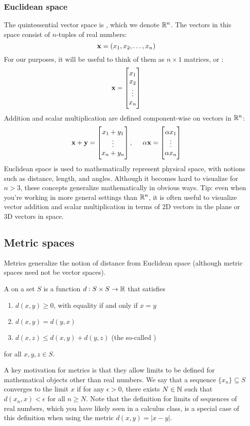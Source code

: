 \subsubsection{Euclidean space}
The quintessential vector space is , which we denote $\mathbb{R}^n$.
The vectors in this space consist of $n$-tuples of real numbers:
\[\mathbf{x} = (x_1, x_2, \dots, x_n)\]
For our purposes, it will be useful to think of them as $n \times 1$ matrices, or :
\[\mathbf{x} = \begin{bmatrix}x_1 \\ x_2 \\ \vdots \\ x_n\end{bmatrix}\]
Addition and scalar multiplication are defined component-wise on vectors in $\mathbb{R}^n$:
\[\mathbf{x} + \mathbf{y} = \begin{bmatrix}x_1 + y_1 \\ \vdots \\ x_n + y_n\end{bmatrix}, \hspace{0.5cm} \alpha\mathbf{x} = \begin{bmatrix}\alpha x_1 \\ \vdots \\ \alpha x_n\end{bmatrix}\]
Euclidean space is used to mathematically represent physical space, with notions such as distance, length, and angles.
Although it becomes hard to visualize for $n > 3$, these concepts generalize mathematically in obvious ways.
Tip: even when you're working in more general settings than $\mathbb{R}^n$, it is often useful to visualize vector addition and scalar multiplication in terms of 2D vectors in the plane or 3D vectors in space.

\subsection{Metric spaces}
Metrics generalize the notion of distance from Euclidean space (although metric spaces need not be vector spaces).

A  on a set $S$ is a function $d : S \times S \to \mathbb{R}$ that satisfies
\begin{enumerate}
\item $d(x,y) \geq 0$, with equality if and only if $x = y$
\item $d(x,y) = d(y,x)$
\item $d(x,z) \leq d(x,y) + d(y,z)$ (the so-called )
\end{enumerate}
for all $x, y, z \in S$.

A key motivation for metrics is that they allow limits to be defined for mathematical objects other than real numbers.
We say that a sequence $\{x_n\} \subseteq S$ converges to the limit $x$ if for any $\epsilon > 0$, there exists $N \in \mathbb{N}$ such that $d(x_n, x) < \epsilon$ for all $n \geq N$.
Note that the definition for limits of sequences of real numbers, which you have likely seen in a calculus class, is a special case of this definition when using the metric $d(x, y) = |x-y|$.

